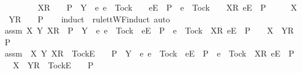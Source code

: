 \ \ \ \ \ \ \ {\isasymrho}\ {\isacharat}\ {\isacharbrackleft}X{\isacharbrackright}\isactrlsub R\ {\isacharhash}\ {\isasymsigma}\ {\isasymin}\ P\ {\isasymLongrightarrow}\ Y\ {\isasyminter}\ {\isacharbraceleft}e{\isachardot}\ e\ {\isasymnoteq}\ Tock\ {\isasymand}\ {\isasymrho}\ {\isacharat}\ {\isacharbrackleft}{\isacharbrackleft}e{\isacharbrackright}\isactrlsub E{\isacharbrackright}\ {\isasymin}\ P\ {\isasymor}\ e\ {\isacharequal}\ Tock\ {\isasymand}\ {\isasymrho}\ {\isacharat}\ {\isacharbrackleft}{\isacharbrackleft}X{\isacharbrackright}\isactrlsub R{\isacharcomma}\ {\isacharbrackleft}e{\isacharbrackright}\isactrlsub E{\isacharbrackright}\ {\isasymin}\ P{\isacharbraceright}\ {\isacharequal}\ {\isacharbraceleft}{\isacharbraceright}\ {\isasymLongrightarrow}\ {\isasymrho}\ {\isacharat}\ {\isacharbrackleft}X\ {\isasymunion}\ Y{\isacharbrackright}\isactrlsub R\ {\isacharhash}\ {\isasymsigma}\ {\isasymin}\ P{\isachardoublequoteclose}\isanewline
\ \ \isamarkupfalse%
\ {\isacharparenleft}induct\ {\isasymrho}\ rule{\isacharcolon}ttWF{\isachardot}induct{\isacharcomma}\ auto{\isacharparenright}\isanewline
\ \ \ \ \isamarkupfalse%
\ assm{}{\isacharcolon}\ {\isachardoublequoteopen}{\isasymAnd}X\ Y{\isachardot}\ {\isacharbrackleft}{\isacharbrackleft}X{\isacharbrackright}\isactrlsub R{\isacharbrackright}\ {\isasymin}\ P\ {\isasymand}\ Y\ {\isasyminter}\ {\isacharbraceleft}e{\isachardot}\ e\ {\isasymnoteq}\ Tock\ {\isasymand}\ {\isacharbrackleft}{\isacharbrackleft}e{\isacharbrackright}\isactrlsub E{\isacharbrackright}\ {\isasymin}\ P\ {\isasymor}\ e\ {\isacharequal}\ Tock\ {\isasymand}\ {\isacharbrackleft}{\isacharbrackleft}X{\isacharbrackright}\isactrlsub R{\isacharcomma}\ {\isacharbrackleft}e{\isacharbrackright}\isactrlsub E{\isacharbrackright}\ {\isasymin}\ P{\isacharbraceright}\ {\isacharequal}\ {\isacharbraceleft}{\isacharbraceright}\ {\isasymLongrightarrow}\ {\isacharbrackleft}{\isacharbrackleft}X\ {\isasymunion}\ Y{\isacharbrackright}\isactrlsub R{\isacharbrackright}\ {\isasymin}\ P{\isachardoublequoteclose}\isanewline
\ \ \ \ \isamarkupfalse%
\ assm{}{\isacharcolon}\ {\isachardoublequoteopen}{\isasymAnd}{\isasymsigma}\ X\ Y{\isachardot}\ {\isacharbrackleft}X{\isacharbrackright}\isactrlsub R\ {\isacharhash}\ {\isacharbrackleft}Tock{\isacharbrackright}\isactrlsub E\ {\isacharhash}\ {\isasymsigma}\ {\isasymin}\ P\ {\isasymand}\ Y\ {\isasyminter}\ {\isacharbraceleft}e{\isachardot}\ e\ {\isasymnoteq}\ Tock\ {\isasymand}\ {\isacharbrackleft}{\isacharbrackleft}e{\isacharbrackright}\isactrlsub E{\isacharbrackright}\ {\isasymin}\ P\ {\isasymor}\ e\ {\isacharequal}\ Tock\ {\isasymand}\ {\isacharbrackleft}{\isacharbrackleft}X{\isacharbrackright}\isactrlsub R{\isacharcomma}\ {\isacharbrackleft}e{\isacharbrackright}\isactrlsub E{\isacharbrackright}\ {\isasymin}\ P{\isacharbraceright}\ {\isacharequal}\ {\isacharbraceleft}{\isacharbraceright}\ {\isasymLongrightarrow}\ {\isacharbrackleft}X\ {\isasymunion}\ Y{\isacharbrackright}\isactrlsub R\ {\isacharhash}\ {\isacharbrackleft}Tock{\isacharbrackright}\isactrlsub E\ {\isacharhash}\ {\isasymsigma}\ {\isasymin}\ P{\isachardoublequoteclose}\isanewline
